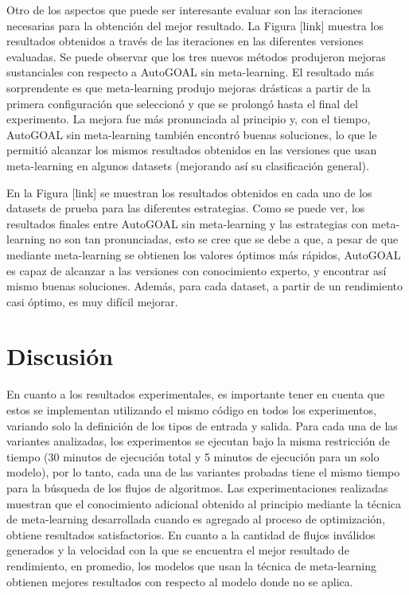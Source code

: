 Otro de los aspectos que puede ser interesante evaluar son las iteraciones necesarias para la obtención del mejor resultado. La Figura [link] muestra los resultados obtenidos a través de las iteraciones en las diferentes versiones evaluadas. Se puede observar que los tres nuevos métodos produjeron mejoras sustanciales con respecto a AutoGOAL sin meta-learning. El resultado más sorprendente es que meta-learning produjo mejoras drásticas a partir de la primera configuración que seleccionó y que se prolongó hasta el final del experimento. La mejora fue más pronunciada al principio y, con el tiempo, AutoGOAL sin meta-learning también encontró buenas soluciones, lo que le permitió alcanzar los mismos resultados obtenidos en las versiones que usan meta-learning en algunos datasets (mejorando así su clasificación general).

En la Figura [link] se muestran los resultados obtenidos en cada uno de los datasets de prueba para las diferentes estrategias. Como se puede ver, los resultados finales entre AutoGOAL sin meta-learning y las estrategias con meta-learning no son tan pronunciadas, esto se cree que se debe a que, a pesar de que mediante meta-learning se obtienen los valores óptimos más rápidos, AutoGOAL es capaz de alcanzar a las versiones con conocimiento experto, y encontrar así mismo buenas soluciones. Además, para cada dataset, a partir de un rendimiento casi óptimo, es muy difícil mejorar.

\section{Discusión}\label{sec:discusion}

%
%
%	
%	
%	

En cuanto a los resultados experimentales, es importante tener en cuenta que estos se implementan utilizando el mismo código en todos los experimentos, variando solo la definición de los tipos de entrada y salida. Para cada una de las variantes analizadas, los experimentos se ejecutan bajo la misma restricción de tiempo (30 minutos de ejecución total y 5 minutos de ejecución para un solo modelo), por lo tanto, cada una de las variantes probadas tiene el mismo tiempo para la búsqueda de los flujos de algoritmos. Las experimentaciones realizadas muestran que el conocimiento adicional obtenido al principio mediante la técnica de meta-learning desarrollada cuando es agregado al proceso de optimización, obtiene resultados satisfactorios. En cuanto a la cantidad de flujos inválidos generados y la velocidad con la que se encuentra el mejor resultado de rendimiento, en promedio, los modelos que usan la técnica de meta-learning obtienen mejores resultados con respecto al modelo donde no se aplica.

